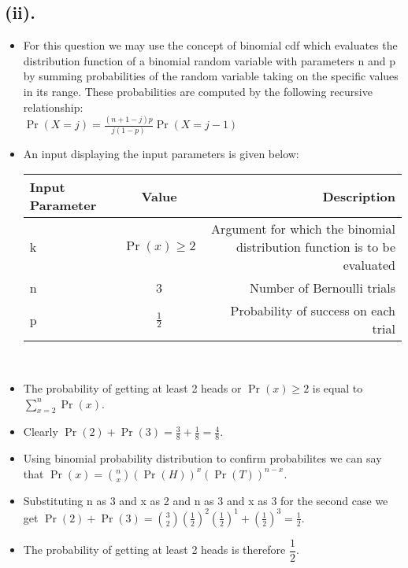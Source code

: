 \documentclass{article}
\begin{document}
	\subsection*{(ii).}
	\begin{itemize}
 \item For this question we may use the concept of binomial cdf which evaluates the distribution function of a binomial random variable with parameters n and p by summing probabilities of the random variable taking on the specific values in its range. These probabilities are computed by the following recursive relationship:\\[4pt]
 $\Pr(X=j)=\frac{(n+1-j)p}{j(1-p)}\Pr(X=j-1)$\\[4pt]
 \item An input displaying the input parameters is given below:\\[3pt]
 \begin{tabular}{|l|c|r|}
  \hline
  Input Parameter & Value & Description\\
  \hline
  k & $\Pr(x)\geq 2$ & Argument for which the binomial distribution function is to be evaluated\\
  \hline
  n & 3 & Number of Bernoulli trials\\
  \hline
  p & $\frac{1}{2}$ & Probability of success on each trial\\[3pt]
  \hline
  \end{tabular}\\[4pt]
		\item The probability of getting at least 2 heads or $\Pr(x)\geq 2$ is equal to $\sum_{x=2}^{n}\Pr(x)$. \\[4pt]
		\item Clearly $\Pr(2)+\Pr(3)= \frac{3}{8}+\frac{1}{8}= \frac{4}{8}$.\\[4pt]
		\item Using binomial probability distribution to confirm probabilites we can say that $\Pr(x)={n\choose x}(\Pr(H))^x(\Pr(T))^{n-x}$.\\[4pt]
		\item Substituting n as 3 and x as 2 and n as 3 and x as 3 for the second case we get $\Pr(2)+\Pr(3)={3\choose 2}(\frac{1}{2})^2(\frac{1}{2})^1+(\frac{1}{2})^3=\frac{1}{2}$.\\[4pt]
		\item The probability of getting at least 2 heads is therefore $\dfrac{1}{2}$.
	\end{itemize}
\end{document}
